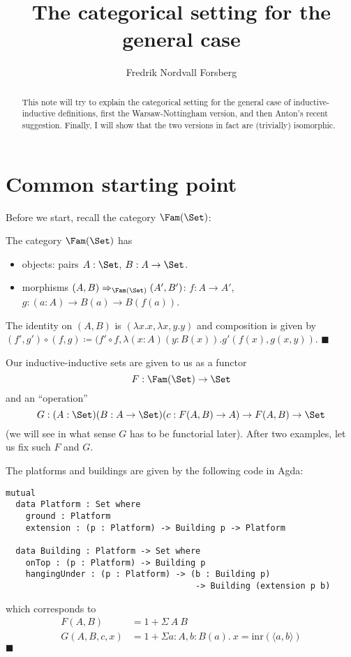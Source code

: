 \documentclass{article}
\title{The categorical setting for the general case} %
\author{Fredrik Nordvall Forsberg}
\begin{document}
\maketitle

\begin{abstract}
  \noindent This note will try to explain the categorical setting for
  the general case of inductive-inductive definitions, first the
  Warsaw-Nottingham version, and then Anton's recent
  suggestion. Finally, I will show that the two versions in fact are
  (trivially) isomorphic.
\end{abstract}

\section{Common starting point}


Before we start, recall the category $\Fam(\Set)$:
\begin{definition}
  The category $\Fam(\Set)$ has
  \begin{itemize}
  \item objects: pairs $A : \Set$, $B : A \to \Set$.
  \item morphisms $(A, B) \Rightarrow_{\Fam(\Set)} (A', B')$: $f : A \to A'$, $g : (a : A) \to B(a) \to B(f(a))$.
  \end{itemize}
  The identity on $(A, B)$ is $(\lambda x . x, \lambda x, y. y)$ and composition is given by $(f', g') \circ (f, g) \coloneqq (f' \circ f, \lambda (x : A)(y : B(x)) . g'(f(x), g(x, y))$.
\hfill $\blacksquare$
\end{definition}

Our inductive-inductive sets are given to us as a functor
\[
F : \Fam(\Set) \to \Set
\]
and an ``operation''
\[
G : (A : \Set)(B : A \to \Set)(c : F(A,B) \to A) \to F(A,B) \to \Set
\]
(we will see in what sense $G$ has to be functorial later). After two
examples, let us fix such $F$ and $G$.

\begin{example}
The platforms and buildings are given by the following code in Agda:
\begin{verbatim}
mutual
  data Platform : Set where
    ground : Platform
    extension : (p : Platform) -> Building p -> Platform

  data Building : Platform -> Set where
    onTop : (p : Platform) -> Building p
    hangingUnder : (p : Platform) -> (b : Building p)
                                      -> Building (extension p b)  
\end{verbatim}
which corresponds to
  \begin{align*}
     F(A, B) &= 1 + \Sigma\ A\ B \\
     G(A, B, c, x) &= 1 + \Sigma a : A, b : B(a).\ x = \text{inr}(\langle a, b\rangle)
  \end{align*}
\hfill $\blacksquare$
\end{example}
\end{document}
